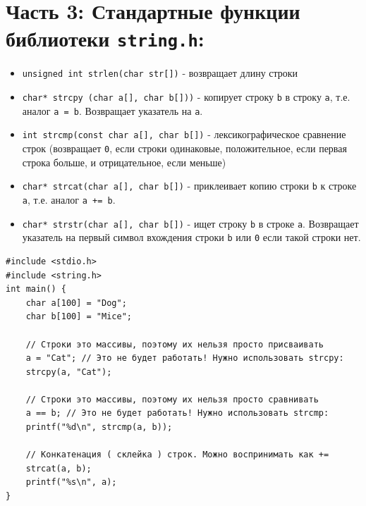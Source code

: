 \documentclass{article}
\begin{document}
\newpage
\section*{Часть 3: Стандартные функции библиотеки \texttt{string.h}:}
\begin{itemize}
\item \texttt{unsigned int strlen(char str[])} - возвращает длину строки
\item \texttt{char* strcpy (char a[], char b[]))} - копирует строку \texttt{b} в строку \texttt{a}, т.е. аналог \texttt{a = b}. Возвращает указатель на \texttt{a}.
\item \texttt{int strcmp(const char a[], char b[])} - лексикографическое сравнение строк (возвращает \texttt{0}, если строки одинаковые, положительное, если первая строка больше, и отрицательное, если меньше)
\item \texttt{char* strcat(char a[], char b[])} - приклеивает копию строки \texttt{b} к строке \texttt{a}, т.е. аналог \texttt{a += b}.
\item \texttt{char* strstr(char a[], char b[])} - ищет строку \texttt{b} в строке \texttt{a}. Возвращает указатель на первый символ вхождения строки \texttt{b} или \texttt{0} если такой строки нет.
\end{itemize}
\begin{lstlisting}
#include <stdio.h>
#include <string.h>
int main() {
	char a[100] = "Dog";
	char b[100] = "Mice";
	
	// Строки это массивы, поэтому их нельзя просто присваивать 
	a = "Cat"; // Это не будет работать! Нужно использовать strcpy:
	strcpy(a, "Cat");
	
	// Строки это массивы, поэтому их нельзя просто сравнивать
	a == b; // Это не будет работать! Нужно использовать strcmp:
	printf("%d\n", strcmp(a, b)); 
	
	// Конкатенация ( склейка ) строк. Можно воспринимать как +=
	strcat(a, b);
	printf("%s\n", a);
}
\end{lstlisting}
\end{document}
